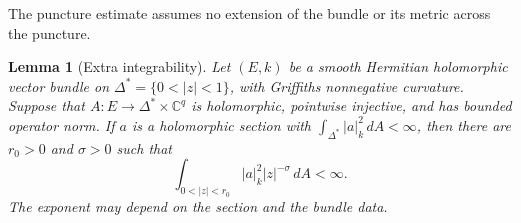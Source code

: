 \documentclass[11pt]{article}
\newtheorem{lemma}[theorem]{Lemma}
\theoremstyle{definition}
\theoremstyle{remark}
\newcommand{\C}{\mathbb C}
\numberwithin{equation}{section}
\begin{document}
The puncture estimate assumes no extension of the bundle or its metric
across the puncture.

\begin{lemma}[Extra integrability]\label{lem:extra-integrability}
Let $(E,k)$ be a smooth Hermitian holomorphic vector bundle on
$\Delta^*=\{0<|z|<1\}$, with Griffiths nonnegative curvature.
Suppose that $A:E\to\Delta^*\times\C^q$ is holomorphic, pointwise
injective, and has bounded operator norm.  If $a$ is a holomorphic
section with $\int_{\Delta^*}|a|_k^2\,dA<\infty$, then there are
$r_0>0$ and $\sigma>0$ such that
\begin{equation}\label{disc:extra-integrability}
 \int_{0<|z|<r_0}|a|_k^2|z|^{-\sigma}\,dA<\infty.
\end{equation}
The exponent may depend on the section and the bundle data.
\end{lemma}
\end{document}
